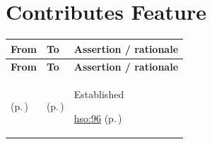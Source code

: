 \section{Contributes Feature}
\begingroup\small\setlength{\TableWidth}{\dimexpr\linewidth-6\tabcolsep-4\arrayrulewidth\relax}
\begin{longtable}{|>{\raggedright\arraybackslash}p{0.27\TableWidth}|>{\raggedright\arraybackslash}p{0.27\TableWidth}|>{\raggedright\arraybackslash}p{0.46\TableWidth}|}
\hline\rowcolor{TableHead}\textbf{From} & \textbf{To} & \textbf{Assertion / rationale}\\\hline\endfirsthead
\hline\rowcolor{TableHead}\textbf{From} & \textbf{To} & \textbf{Assertion / rationale}\\\hline\endhead
\hline\endfoot
\nameref{function:manage-ward-capacity} (p.\,\pageref{function:manage-ward-capacity}) & \nameref{feature:feat-hso-03} (p.\,\pageref{feature:feat-hso-03}) & Established

 \hyperref[rad:hso:90]{hso:96} (p.\,\pageref{rad:hso:90})\\\hline
\end{longtable}\endgroup
